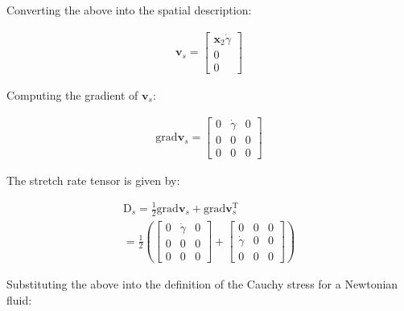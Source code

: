 \begin{problem}
\begin{enumerate}
Converting the above into the spatial description:


\begin{align}
\mathbf{v}_{s}=\begin{bmatrix}
\mathbf{x}_{2}\dot{\gamma} \\
0 \\
0
\end{bmatrix}
\end{align}

Computing the gradient of $\mathbf{v}_{s}$:


\begin{align}
\text{grad}\mathbf{v}_{s} = \begin{bmatrix}
0 & \dot{\gamma} & 0 \\
0 & 0 & 0 \\
0 & 0 & 0
\end{bmatrix}
\end{align}


The stretch rate tensor is given by:


\begin{align}
\text{D}_{s}=\frac{1}{2} \text{grad}\mathbf{v}_{s}+\text{grad}\mathbf{v}_{s}^{\text{T}} \\
=\frac{1}{2}\left(\begin{bmatrix}
0 & \dot{\gamma} & 0 \\
0 & 0 & 0 \\
0 & 0 & 0
\end{bmatrix}+\begin{bmatrix}
0 & 0 & 0 \\
\dot{\gamma} & 0 & 0 \\
0 & 0 & 0
\end{bmatrix}\right)
\end{align}


Substituting the above into the definition of the Cauchy stress for a Newtonian fluid:


\end{enumerate}
\end{problem}

